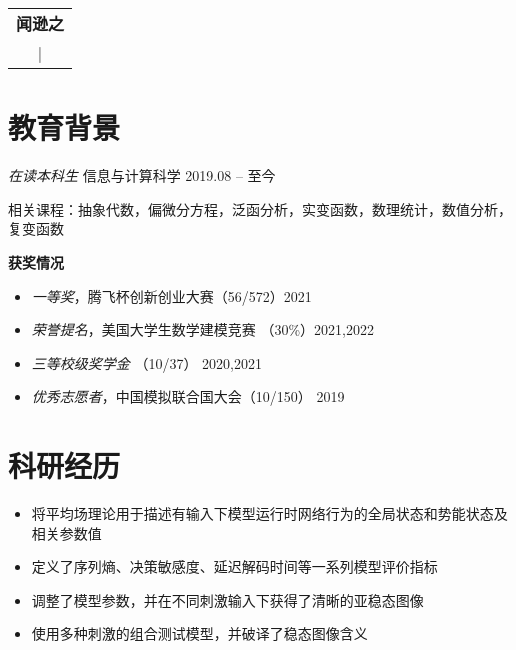 \documentclass{resume}
\begin{document}
\begin{table}
  \centering
  \Large{
  \begin{tabu}{ c }
    \centering
    \textbf{\huge{闻逊之}}   \\
     |  \\
  \end{tabu}
}
\end{table}

\vspace{2pt}
\section{教育背景}
\textit{在读本科生} \quad 信息与计算科学 \hfill{2019.08 -- 至今}

相关课程：抽象代数，偏微分方程，泛函分析，实变函数，数理统计，数值分析，复变函数

\textbf{获奖情况}
\begin{itemize}
  \item \textit{一等奖}，腾飞杯创新创业大赛（56/572）\hfill 2021
  \item \textit{荣誉提名}，美国大学生数学建模竞赛 （30\%）\hfill 2021,2022
  \item \textit{三等校级奖学金} （10/37） \hfill 2020,2021
  \item \textit{优秀志愿者}，中国模拟联合国大会（10/150） \hfill 2019
\end{itemize}

\section{科研经历}

\begin{itemize}
  \item 将平均场理论用于描述有输入下模型运行时网络行为的全局状态和势能状态及相关参数值
  \item 定义了序列熵、决策敏感度、延迟解码时间等一系列模型评价指标
  \item 调整了模型参数，并在不同刺激输入下获得了清晰的亚稳态图像
  \item 使用多种刺激的组合测试模型，并破译了稳态图像含义
\end{itemize}
\end{document}
